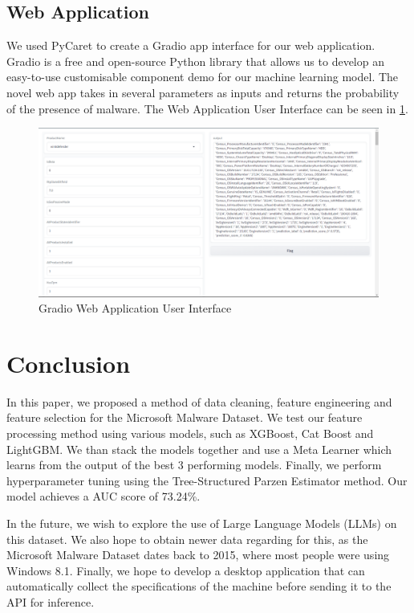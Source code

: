 \documentclass[pdflatex,sn-basic,Numbered]{sn-jnl}%
\theoremstyle{thmstyleone}%
\theoremstyle{thmstyletwo}%
\theoremstyle{thmstylethree}%
\begin{document}
\subsection{Web Application}
We used PyCaret to create a Gradio \cite{gradio} app interface for our web application. Gradio is a free and open-source Python library that allows us to develop an easy-to-use customisable component demo for our machine learning model. The novel web app takes in several parameters as inputs and returns the probability of the presence of malware. The Web Application User Interface can be seen in \ref{fig:enter-label}.
\begin{figure}
    \centering
    \includegraphics[width=\linewidth]{images/Gradio App Screenshot.png}
    \caption{Gradio Web Application User Interface}
    \label{fig:enter-label}
\end{figure}

\section{Conclusion}
In this paper, we proposed a method of data cleaning, feature engineering and feature selection for the Microsoft Malware Dataset. We test our feature processing method using various models, such as XGBoost, Cat Boost and LightGBM. We than stack the models together and use a Meta Learner which learns from the output of the best 3 performing models. Finally, we perform hyperparameter tuning using the Tree-Structured Parzen Estimator method. Our model achieves a AUC score of 73.24\%. 

In the future, we wish to explore the use of Large Language Models (LLMs) on this dataset. We also hope to obtain newer data regarding for this, as the Microsoft Malware Dataset dates back to 2015, where most people were using Windows 8.1. Finally, we hope to develop a desktop application that can automatically collect the specifications of the machine before sending it to the API for inference. 






\newpage

% 

\end{document}
